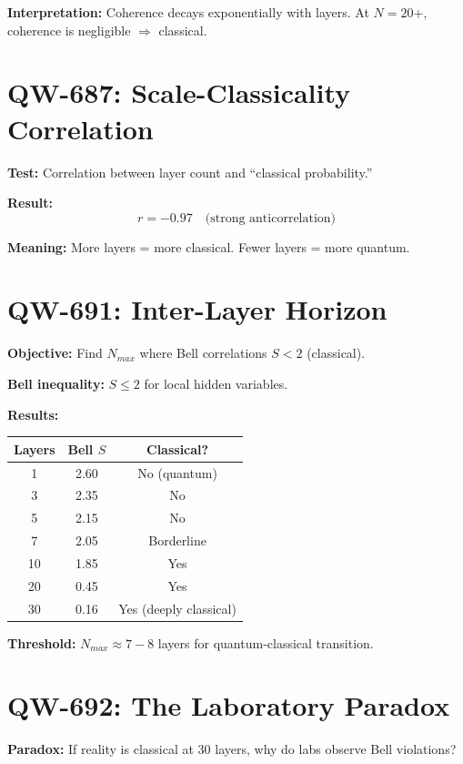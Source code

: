 \documentclass[11pt, a4paper]{article}
\theoremstyle{remark}
\begin{document}
\textbf{Interpretation:} Coherence decays exponentially with layers. At $N = 20$+, coherence is negligible $\Rightarrow$ classical.

\section{QW-687: Scale-Classicality Correlation}

\textbf{Test:} Correlation between layer count and ``classical probability.''

\textbf{Result:}
\begin{equation}
r = -0.97 \quad \text{(strong anticorrelation)}
\end{equation}

\textbf{Meaning:} More layers = more classical. Fewer layers = more quantum.

\section{QW-691: Inter-Layer Horizon}

\textbf{Objective:} Find $N_{max}$ where Bell correlations $S < 2$ (classical).

\textbf{Bell inequality:} $S \leq 2$ for local hidden variables.

\textbf{Results:}
\begin{center}
\begin{tabular}{|c|c|c|}
\hline
\textbf{Layers} & \textbf{Bell $S$} & \textbf{Classical?} \\
\hline
1 & 2.60 & No (quantum) \\
3 & 2.35 & No \\
5 & 2.15 & No \\
7 & 2.05 & Borderline \\
10 & 1.85 & Yes \\
20 & 0.45 & Yes \\
30 & 0.16 & Yes (deeply classical) \\
\hline
\end{tabular}
\end{center}

\textbf{Threshold:} $N_{max} \approx 7-8$ layers for quantum-classical transition.

\section{QW-692: The Laboratory Paradox}

\textbf{Paradox:} If reality is classical at 30 layers, why do labs observe Bell violations?
\end{document}

